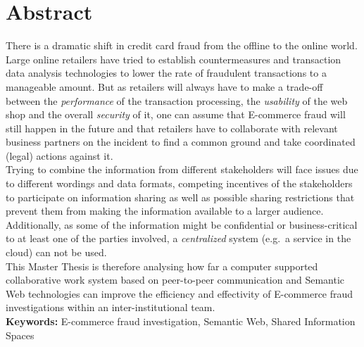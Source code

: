 
\chapter*{Abstract}

There is a dramatic shift in credit card fraud from the offline to the online world. Large online retailers have tried to establish countermeasures and transaction data analysis technologies to lower the rate of fraudulent transactions to a manageable amount. But as retailers will always have to make a trade-off between the \emph{performance} of the transaction processing, the \emph{usability} of the web shop and the overall \emph{security} of it, one can assume that \gls{E-commerce} fraud will still happen in the future and that retailers have to collaborate with relevant business partners on the incident to find a common ground and take coordinated (legal) actions against it. \\

Trying to combine the information from different stakeholders will face issues due to different wordings and data formats, competing incentives of the stakeholders to participate on information sharing as well as possible sharing restrictions that prevent them from making the information available to a larger audience. Additionally, as some of the information might be confidential or business-critical to at least one of the parties involved, a \emph{centralized} system (e.g.\ a service in the cloud) can not be used. \\

This Master Thesis is therefore analysing how far a computer supported collaborative work system based on peer-to-peer communication and Semantic Web technologies can improve the efficiency and effectivity of \gls{E-commerce} fraud investigations within an inter-institutional team. \\[2em]

\textbf{Keywords:} \gls{E-commerce} fraud investigation, Semantic Web, Shared Information Spaces
